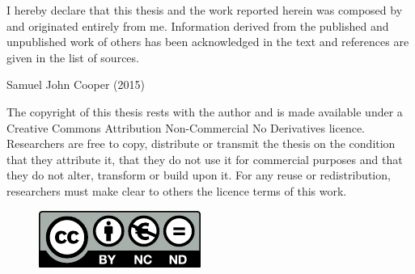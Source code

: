 \vspace*{\fill}
\begin{center}
I hereby declare that this thesis and the work reported herein was composed by and originated entirely from me. Information derived from the published and unpublished work of others has been acknowledged in the text and references are given in the list of sources.

\begin{flushright}
Samuel John Cooper (2015)
\end{flushright}
\end{center}
\vspace*{\fill}

The copyright of this thesis rests with the author and is made available under a Creative Commons Attribution Non-Commercial No Derivatives licence. Researchers are free to copy, distribute or transmit the thesis on the condition that they attribute it, that they do not use it for commercial purposes and that they do not alter, transform or build upon it. For any reuse or redistribution, researchers must make clear to others the licence terms of this work.
\begin{figure}
\begin{flushright}
\includegraphics{C0/Figs/CC-BY-NC-ND}
\end{flushright}
\end{figure}